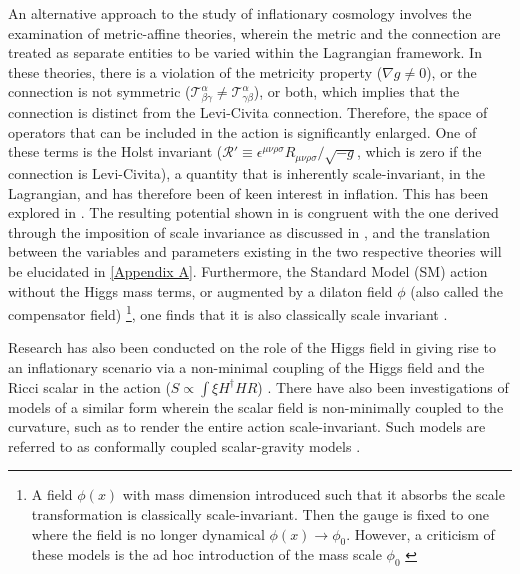 \documentclass[aps,prd,reprint,preprintnumbers,showpacs,floatfix,nofootinbib,superscript address]{revtex4-2}
\begin{document}
An alternative approach to the study of inflationary cosmology involves the examination of metric-affine theories, wherein the metric and the connection are treated as separate entities to be varied within the Lagrangian framework. In these theories, there is a violation of the metricity property ($\nabla g \neq 0$), or the connection is not symmetric ($\mathcal{T}^\alpha_{\beta \gamma} \neq \mathcal{T}^\alpha_{\gamma\beta}$), or both, which implies that the connection is distinct from the Levi-Civita connection. Therefore, the space of operators that can be included in the action is significantly enlarged. One of these terms is the Holst invariant ($\mathcal{R}' \equiv \epsilon^{\mu\nu\rho\sigma}R_{\mu\nu\rho\sigma}/\sqrt{-g}$, which is zero if the connection is Levi-Civita), a quantity that is inherently scale-invariant, in the Lagrangian, and has therefore been of keen interest in inflation. This has been explored in \cite{Salvio_2022, pradisi2022equivalence}. The resulting potential shown in \cite{Salvio_2022} is congruent with the one derived through the imposition of scale invariance as discussed in \cite{barker2024poincaregaugetheoryconformal}, and the translation between the variables and parameters existing in the two respective theories will be elucidated in \cref{Appendix A}. Furthermore, the Standard Model (SM) action without the Higgs mass terms, or augmented by a dilaton field $\phi$ (also called the compensator field) \footnote{A field $\phi(x)$ with mass dimension introduced such that it absorbs the scale transformation is classically scale-invariant. Then the gauge is fixed to one where the field is no longer dynamical $\phi(x) \rightarrow \phi_0$. However, a criticism of these models is the ad hoc introduction of the mass scale $\phi_0$ \cite{bars2014local} \label{Footnote Criticism}}, one finds that it is also classically scale invariant \cite{bardeen1995naturalness, bars2014local}. 

Research has also been conducted on the role of the Higgs field in giving rise to an inflationary scenario via a non-minimal coupling of the Higgs field and the Ricci scalar in the action ($S\propto \int \xi H^\dag H R$) \cite{bezrukov_standard_2008}. There have also been investigations of models of a similar form wherein the scalar field is non-minimally coupled to the curvature, such as to render the entire action scale-invariant. Such models are referred to as conformally coupled scalar-gravity models \cite{kallosh_superconformal_2013, kallosh_hidden_2014}. 
\end{document}
